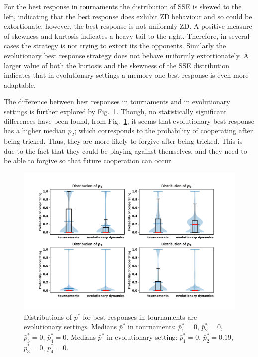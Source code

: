 \documentclass[9pt,twocolumn,twoside,lineno]{pnas-new}
\begin{document}
For the best response in tournaments the distribution of SSE is skewed to the
left, indicating that the best response does exhibit ZD behaviour and so could
be extortionate,
however, the best response is not uniformly ZD. A positive measure of
skewness and kurtosis indicates a heavy tail to the right. Therefore, in several
cases the strategy is not trying to extort its the opponents. Similarly the
evolutionary best response strategy does not behave uniformly extortionately. A
larger value of both the kurtosis and the skewness of the SSE distribution
indicates that in evolutionary settings a memory-one best response is even more
adaptable.

The difference between best responses in tournaments and in evolutionary
settings is further explored by Fig.~\ref{fig:behaviour_violin_plots}.
Though, no statistically significant differences have been found, from
Fig.~\ref{fig:behaviour_violin_plots}, it seems that evolutionary best
response has a higher median $p_2$; which corresponds to the probability of cooperating
after being tricked. Thus, they are more likely to forgive after
being tricked. This is due to the fact that they could be playing against
themselves, and they need to be able to forgive so that future cooperation can
occur.

\begin{table}
\begin{center}
\end{center}
\caption{SSE of best response memory-one when \(N=2\)}\label{table:sserror_stats}
\end{table}

\begin{figure}[!htbp]
    \includegraphics[width=.55\textwidth]{behaviour_violin_plots.pdf}
    \caption{Distributions of \(p^*\) for best responses in tournaments are
    evolutionary settings. Medians \(\bar{p}^*\) in tournaments: \(\bar{p}^*_{1}=0\),
    \(\bar{p}^*_{2}=0\), \(\bar{p}^*_{3}=0\), \(\bar{p}^*_{4}=0\).
    Medians \(\bar{p}^*\) in evolutionary setting: \(\bar{p}^*_{1}=0\),
    \(\bar{p}^*_{2}=0.19\), \(\bar{p}^*_{3}=0\), \(\bar{p}^*_{4}=0\).}
    \label{fig:behaviour_violin_plots}
\end{figure}
\end{document}
